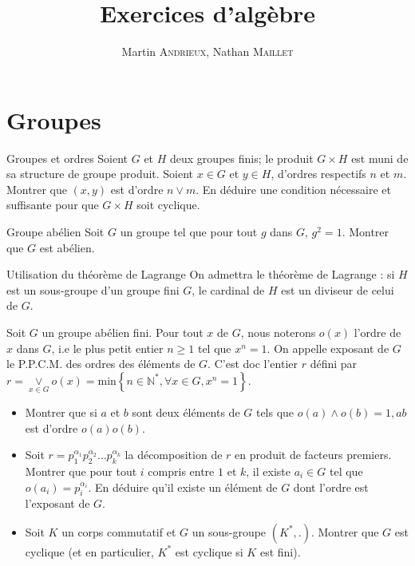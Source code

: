 \documentclass[french, a4paper, 11pt]{article}
\title{Exercices d'algèbre}
\author{Martin \textsc{Andrieux}, Nathan \textsc{Maillet}}
\date{}
\newcommand{\N}{\mathbb{N}}   %
\begin{document}
\maketitle
\section*{Groupes}
\begin{cadre}{Groupes et ordres}
  Soient \(G\) et \(H\) deux groupes finis; le produit \(G\times H\) est muni de sa structure de groupe produit.
  Soient \(x\in G\) et \(y\in H\), d'ordres respectifs \(n\) et \(m\). Montrer que \((x,y)\) est d'ordre \(n\vee m\).
  En déduire une condition nécessaire et suffisante pour que \(G\times H\) soit cyclique.
\end{cadre}

\begin{cadre}{Groupe abélien}
  Soit \(G\) un groupe tel que pour tout \(g\) dans \(G\), \(g^{2} = 1\). Montrer que \(G\) est abélien.
\end{cadre}

\begin{cadre}{Utilisation du théorème de Lagrange}
    On admettra le théorème de Lagrange : si $H$ est un sous-groupe d'un groupe fini $G$, le cardinal de $H$ est un diviseur
    de celui de $G$.
    
    
    Soit $G$ un groupe abélien fini. Pour tout $x$ de $G$, nous noterons $o(x)$ l'ordre de $x$ dans $G$, i.e le plus petit
    entier $n \geq 1$ tel que $x^n=1$. On appelle exposant de $G$ le P.P.C.M. des ordres des éléments de $G$. C'est doc
    l'entier $r$ défini par \(r=\underset{x \in G}{\vee} o(x)=\text{min}\left\{n \in \N^*, \forall x \in G, x^n=1\right\}\).
    \begin{itemize}[label=$\bullet$]
        \item Montrer que si $a$ et $b$ sont deux éléments de $G$ tels que \(o(a) \wedge o(b)=1, ab\) est d'ordre \(o(a)o(b)\).
        \item Soit \(r=p_1^{\alpha_1}p_2^{\alpha_2} \ldots p_k^{\alpha_k}\) la décomposition de $r$ en produit de facteurs premiers.
        Montrer que pour tout $i$ compris entre $1$ et $k$, il existe $a_i \in G$ tel que \(o(a_i)=p_i^{\alpha_i}\).
        En déduire qu'il existe un élément de $G$ dont l'ordre est l'exposant de $G$.    
        \item Soit $K$ un corps commutatif et $G$ un sous-groupe \((K^*,.)\). Montrer que $G$ est cyclique
        (et en particulier, $K^*$ est cyclique si $K$ est fini). 
    \end{itemize}   
\end{cadre}
\end{document}
